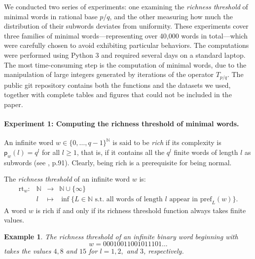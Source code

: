 \documentclass{template_arxiv}
\newtheorem{example}[theorem]{Example}
\numberwithin{equation}{section}
\newcommand{\N}{\mathbb N}
\newcommand{\pref}{\mathrm{pref}}
\newcommand{\rt}{\mathrm{rt}}
\begin{document}
We conducted two series of experiments: one examining the
\emph{richness threshold} of minimal words in rational base $p/q$, and the other measuring how
much the distribution of their subwords deviates from uniformity. These  experiments cover three families of minimal words---representing over 40,000 words in total---which were carefully chosen to avoid exhibiting particular behaviors. The computations were performed using Python 3 and required several days on a standard laptop. The most time-consuming step is the computation of minimal words, due to the manipulation of large integers generated by iterations of the operator $T_{p/q}$. The public git repository \cite{Git26} contains both the functions and the datasets we used, together with complete tables and figures that could not be included in the paper. 



\paragraph{Experiment 1: Computing the richness threshold of minimal words.}

 An infinite word $w \in \{0,\dots,q-1\}^{\N}$ is said to be \emph{rich} if its complexity is $\mathsf{p}_w(l)=q^l$ for all $l\geq 1$, that is, if it contains all the $q^l$ finite words of length $l$ as subwords (see \cite{Bug12}, p.91). Clearly, being rich is a prerequisite for being normal.
 
The \emph{richness threshold} of an infinite word $w$ is:
\[ \begin{array}{rccl} \rt_w:&\N&\longrightarrow&\N\cup\{\infty\}\\
        & l&\longmapsto& \inf\{L\in\N \text{ s.t. all words of length $l$ appear in $\pref_L(w)$}\}.
    \end{array}
\]
A word $w$ is rich if and only if its richness threshold function always takes finite values.

\begin{example}\label{ex:richness-threshold}
	The richness threshold of an infinite binary word beginning with
	\[w = 00010011001011101...\]
	takes the values $4, 8$ and $15$ for $l=1,2,$ and $3$, respectively.
\end{example}
\end{document}
